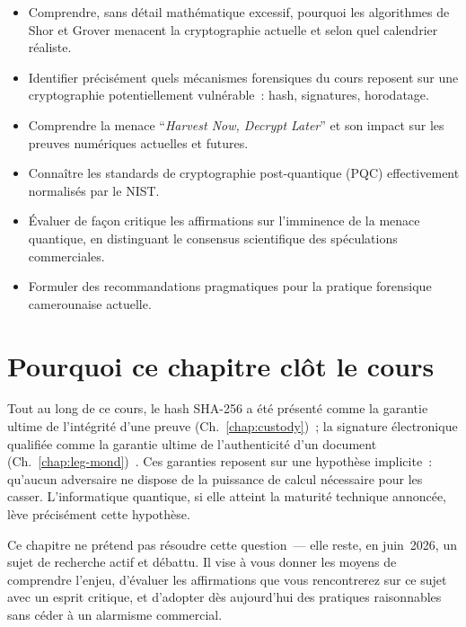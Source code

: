 \begin{boxobjectifs}
\begin{itemize}
    \item Comprendre, sans détail mathématique excessif, pourquoi
          les algorithmes de Shor et Grover menacent la cryptographie
          actuelle et selon quel calendrier réaliste.
    \item Identifier précisément quels mécanismes forensiques du
          cours reposent sur une cryptographie potentiellement
          vulnérable~: hash, signatures, horodatage.
    \item Comprendre la menace ``\textit{Harvest Now, Decrypt Later}''
          et son impact sur les preuves numériques actuelles et futures.
    \item Connaître les standards de cryptographie post-quantique
          (PQC) effectivement normalisés par le NIST.
    \item Évaluer de façon critique les affirmations sur l'imminence
          de la menace quantique, en distinguant le consensus
          scientifique des spéculations commerciales.
    \item Formuler des recommandations pragmatiques pour la
          pratique forensique camerounaise actuelle.
\end{itemize}
\end{boxobjectifs}

\bigskip

\section*{Pourquoi ce chapitre clôt le cours}

Tout au long de ce cours, le hash SHA-256 a été présenté comme la
garantie ultime de l'intégrité d'une preuve (Ch.~\ref{chap:custody})~;
la signature électronique qualifiée comme la garantie ultime de
l'authenticité d'un document (Ch.~\ref{chap:leg-mond})~. Ces garanties
reposent sur une hypothèse implicite~: qu'aucun adversaire ne dispose
de la puissance de calcul nécessaire pour les casser. L'informatique
quantique, si elle atteint la maturité technique annoncée, lève
précisément cette hypothèse.

Ce chapitre ne prétend pas résoudre cette question~--- elle reste,
en juin~2026, un sujet de recherche actif et débattu. Il vise à vous
donner les moyens de comprendre l'enjeu, d'évaluer les affirmations
que vous rencontrerez sur ce sujet avec un esprit critique, et
d'adopter dès aujourd'hui des pratiques raisonnables sans céder
à un alarmisme commercial.

